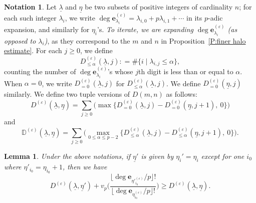 \documentclass[12pt]{amsart}
\newcommand{\bin}[1]{{\color{red} \sf $\heartsuit\heartsuit\heartsuit$ Bin: [#1]}}
\newtheorem{lemma}[subsection]{Lemma}
\theoremstyle{definition}
\newtheorem{notation}[subsection]{Notation}
\numberwithin{equation}{subsection}
\def\DD{\mathbb{D}}
\def\bfe{\mathbf{e}}
\begin{document}
\begin{notation}
\label{N:definition of D tuple}
Let $\underline \lambda$ and $\underline \eta$ be two subsets of positive integers of cardinality $n$; for each such integer $\lambda_i$, we write $\deg \bfe^{(\varepsilon)}_{\lambda_i} = \lambda_{i,0}+p\lambda_{i,1}+\cdots$ in its $p$-adic expansion, and similarly for $\eta_i$'s. \emph{To iterate, we are expanding $\deg \bfe_{\lambda_i}^{(\varepsilon)}$ (as opposed to $\lambda_i$)}, as they correspond to the $m$ and $n$ in Proposition~\ref{P:finer halo estimate}.
For each $j\geq 0$, we define 
$$
D_{\leq \alpha}^{(\varepsilon)}(\underline \lambda,j): = \#\{i\;|\;  \lambda_{i,j} \leq \alpha\} ,
$$
counting the number of $\deg \bfe_{\lambda_i}^{(\varepsilon)}$'s whose $j$th digit is less than or equal to $\alpha$. When $\alpha=0$, we write $D^{(\varepsilon)}_{=0}(\underline \lambda, j)$ for $D_{\leq \alpha}^{(\varepsilon)}(\underline \lambda,j)$. We define $D_{=0}^{(\varepsilon)}(\underline \eta, j)$ similarly.
We define two tuple versions of $D(m,n)$ as follows:
$$
D^{(\varepsilon)}(\underline \lambda, \underline \eta) = \sum_{j \geq 0} \Big( \max \big\{D^{(\varepsilon)}_{=0}(\underline \lambda, j)-D^{(\varepsilon)}_{=0}(\underline \eta, j+1), \ 0\big \}\Big)
$$
and 
$$
\DD^{(\varepsilon)}(\underline \lambda, \underline \eta) = \sum_{j \geq 0} \Big( \max\limits_{0\leq \alpha\leq p-2} \big\{D^{(\varepsilon)}_{\leq \alpha}(\underline \lambda, j)-D^{(\varepsilon)}_{\leq \alpha}(\underline \eta, j+1), \ 0\big \}\Big).
$$



\begin{lemma}
\label{L:comparing D(lambda,eta') and D(lambda eta)}
Under the above notations, if $\underline \eta'$ is given by $\eta_i'=\eta_i$ except for one $i_0$ where $\eta'_{i_0}=\eta_{i_0}+1$, then we have 
\begin{equation}\label{E:a complicated inequality comparing D(lambda,eta) for different tuples}
D^{(\varepsilon)}(\underline \lambda,\underline \eta')+v_p\bigg( \frac{\big\lfloor \deg\bfe_{\eta'^{(\varepsilon)}_{i_0}}/p\big\rfloor! }{\big\lfloor \deg\bfe_{\eta_{i_0}^{(\varepsilon)}}/p\big\rfloor!}\bigg)\geq D^{(\varepsilon)}(\underline \lambda,\underline \eta).
	\end{equation}
\end{lemma}


\end{notation}
\end{document}
